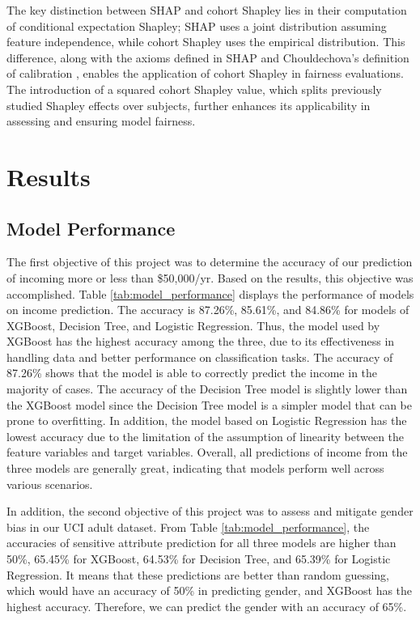 \documentclass[conference]{IEEEtran}
\begin{document}
The key distinction between SHAP \cite{lundberg2017unified} and cohort Shapley lies in their computation of conditional expectation Shapley; SHAP uses a joint distribution assuming feature independence, while cohort Shapley uses the empirical distribution. This difference, along with the axioms defined in SHAP and Chouldechova’s definition of calibration \cite{chouldechova2017fair}, enables the application of cohort Shapley in fairness evaluations. The introduction of a squared cohort Shapley value, which splits previously studied Shapley effects over subjects, further enhances its applicability in assessing and ensuring model fairness.


\section{Results}
\subsection{Model Performance}
The first objective of this project was to determine the accuracy of our prediction of incoming more or less than \$50,000/yr. Based on the results, this objective was accomplished. Table \ref{tab:model_performance} displays the performance of models on income prediction.  The accuracy is 87.26\%, 85.61\%, and 84.86\% for models of XGBoost, Decision Tree, and Logistic Regression. Thus, the model used by XGBoost has the highest accuracy among the three, due to its effectiveness in handling data and better performance on classification tasks. The accuracy of 87.26\% shows that the model is able to correctly predict the income in the majority of cases. The accuracy of the Decision Tree model is slightly lower than the XGBoost model since the Decision Tree model is a simpler model that can be prone to overfitting. In addition,  the model based on Logistic Regression has the lowest accuracy due to the limitation of the assumption of linearity between the feature variables and target variables. Overall,  all predictions of income from the three models are generally great, indicating that models perform well across various scenarios.

In addition, the second objective of this project was to assess and mitigate gender bias in our UCI adult dataset. From Table \ref{tab:model_performance}, the accuracies of sensitive attribute prediction for all three models are higher than 50\%, 65.45\% for XGBoost, 64.53\% for Decision Tree, and 65.39\% for Logistic Regression. It means that these predictions are better than random guessing, which would have an accuracy of 50\% in predicting gender, and XGBoost has the highest accuracy. Therefore, we can predict the gender with an accuracy of 65\%. 
\end{document}
